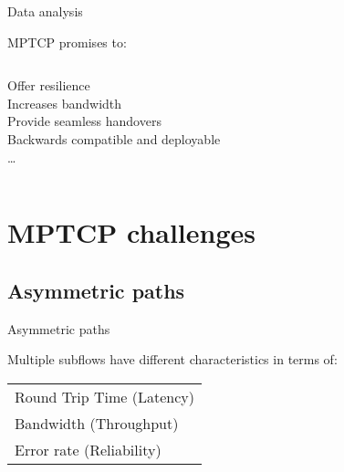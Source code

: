 \documentclass{beamer}
\begin{document}
\begin{frame}{Data analysis}
\end{frame}


\begin{frame}{MPTCP promises to: }
  \begin{columns}
    \begin{column}{\textwidth}
        \begin{center}
          Offer resilience \\
          \vspace{0.7cm}
          Increases bandwidth\\
          \vspace{0.7cm}
          Provide seamless handovers\\
          \vspace{0.7cm}
          Backwards compatible and deployable\\
          \vspace{0.6cm}
          \ldots \\
          \vspace{0.6cm}
        \end{center}
      \end{column}
    \end{columns}
\end{frame}


\section{MPTCP challenges}
\subsection{Asymmetric paths}
\begin{frame}{Asymmetric paths}

  \begin{center}
    \Large \color{uos-red-full} Multiple subflows have different characteristics in terms of:
  \end{center}
  \vspace{0.5cm}


  \begin{table}
    \centering
    \begin{tabular}{@{}l@{}}
      \large\tabitem{} Round Trip Time (Latency)\\[10pt]
      \large\tabitem{} Bandwidth (Throughput)\\[10pt]
      \large\tabitem{} Error rate (Reliability)
    \end{tabular}
  \end{table}
\end{frame}
\end{document}
